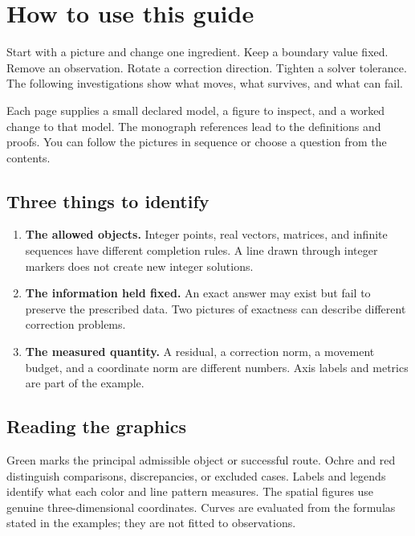 \documentclass[11pt]{article}
\begin{document}
\KomorebiCover
{}
\begingroup
\makeatletter
\renewcommand{\@pnumwidth}{3em}
\renewcommand{\@tocrmarg}{4em}
\makeatother
\tableofcontents
\endgroup
\clearpage{}
\section*{How to use this guide}
Start with a picture and change one ingredient. Keep a boundary value fixed. Remove an observation. Rotate a correction direction. Tighten a solver tolerance. The following investigations show what moves, what survives, and what can fail.

Each page supplies a small declared model, a figure to inspect, and a worked change to that model. The monograph references lead to the definitions and proofs. You can follow the pictures in sequence or choose a question from the contents.

\subsection*{Three things to identify}
\begin{enumerate}
\item \textbf{The allowed objects.} Integer points, real vectors, matrices, and infinite sequences have different completion rules. A line drawn through integer markers does not create new integer solutions.
\item \textbf{The information held fixed.} An exact answer may exist but fail to preserve the prescribed data. Two pictures of exactness can describe different correction problems.
\item \textbf{The measured quantity.} A residual, a correction norm, a movement budget, and a coordinate norm are different numbers. Axis labels and metrics are part of the example.
\end{enumerate}

\subsection*{Reading the graphics}
Green marks the principal admissible object or successful route. Ochre and red distinguish comparisons, discrepancies, or excluded cases. Labels and legends identify what each color and line pattern measures. The spatial figures use genuine three-dimensional coordinates. Curves are evaluated from the formulas stated in the examples; they are not fitted to observations.
\end{document}
